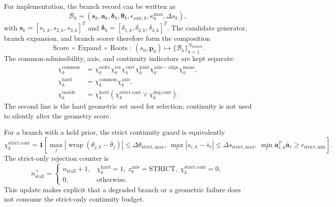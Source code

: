 \documentclass[12pt,a4paper]{report}
\begin{document}
For implementation, the branch record can be written as
\begin{equation}
\mathcal{B}_k=
\left(
\mathbf{s}_k,\mathbf{a}_k,\boldsymbol{\delta}_k,
\boldsymbol{\theta}_k,\epsilon_{\mathrm{axis},k},
\kappa_k^{\max},\Delta s_k
\right),
\tag{8.126}
\label{eq:ch8-branch-record}
\end{equation}
with $\mathbf{s}_k=[s_{1,k},s_{2,k},s_{3,k}]^T$ and
$\boldsymbol{\delta}_k=[\delta_{1,k},\delta_{2,k},\delta_{3,k}]^T$.
The candidate generator, branch expansion, and branch scorer therefore form
the composition
\begin{equation}
\operatorname{Score}\circ\operatorname{Expand}\circ\operatorname{Roots}
:\ (s_0,\mathbf{p}_0)\longmapsto
\{\mathcal{B}_k\}_{k=1}^{N_{\mathrm{branch}}}.
\tag{8.127}
\label{eq:ch8-tree-composition}
\end{equation}
The common-admissibility, axis, and continuity indicators are kept separate:
\begin{align}
\chi_k^{\mathrm{common}}
&=\chi_k^{\mathrm{order}}
\chi_k^{\mathrm{res}}
\chi_k^{\mathrm{curv}}
\chi_k^{\mathrm{joint}}
\chi_k^{\mathrm{axis-align}}
\chi_k^{\mathrm{mono}},
\tag{8.128}\\
\chi_k^{\mathrm{hard}}
&=\chi_k^{\mathrm{common}}\chi_k^{\mathrm{axis}},
\tag{8.129}\\
\chi_k^{\mathrm{usable}}
&=\chi_k^{\mathrm{hard}}
\left(\chi_k^{\mathrm{strict.cont}}
\lor\chi_k^{\mathrm{deg.cont}}\right).
\tag{8.130}
\end{align}
The second line is the hard geometric set used for selection; continuity is
not used to silently alter the geometry score.

For a branch with a held prior, the strict continuity guard is equivalently
\begin{equation}
\chi_k^{\mathrm{strict.cont}}
=\mathbf{1}\!\left[
\max_j|\operatorname{wrap}(\theta_{j,k}-\bar\theta_j)|
\leq\Delta\theta_{\mathrm{strict,max}},\
\max_r|s_{r,k}-\bar s_r|
\leq\Delta s_{\mathrm{strict,max}},\
\min_r\mathbf{a}_{r,k}^{T}\bar{\mathbf{a}}_r
\geq c_{\mathrm{strict,min}}
\right].
\tag{8.131}
\label{eq:ch8-strict-continuity}
\end{equation}
The strict-only rejection counter is
\begin{equation}
n_{\mathrm{stall}}^{+}=
\begin{cases}
n_{\mathrm{stall}}+1,&
\chi_k^{\mathrm{hard}}=1,\ z_k^{\mathrm{axis}}=\mathrm{STRICT},\
\chi_k^{\mathrm{strict.cont}}=0,\\
0,&\text{otherwise}.
\end{cases}
\tag{8.132}
\label{eq:ch8-strict-stall-counter}
\end{equation}
This update makes explicit that a degraded branch or a geometric failure does
not consume the strict-only continuity budget.
\end{document}
